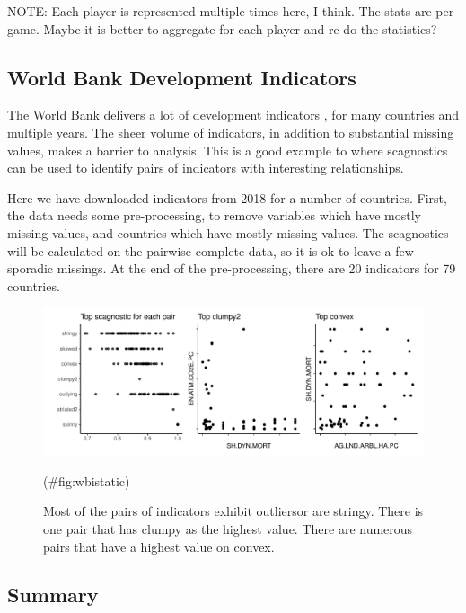 NOTE: Each player is represented multiple times here, I think. The stats
are per game. Maybe it is better to aggregate for each player and re-do
the statistics?

\hypertarget{world-bank-development-indicators}{%
\subsection{World Bank Development
Indicators}\label{world-bank-development-indicators}}

The World Bank delivers a lot of development indicators \citep{WBI}, for
many countries and multiple years. The sheer volume of indicators, in
addition to substantial missing values, makes a barrier to analysis.
This is a good example to where scagnostics can be used to identify
pairs of indicators with interesting relationships.

Here we have downloaded indicators from 2018 for a number of countries.
First, the data needs some pre-processing, to remove variables which
have mostly missing values, and countries which have mostly missing
values. The scagnostics will be calculated on the pairwise complete
data, so it is ok to leave a few sporadic missings. At the end of the
pre-processing, there are 20 indicators for 79 countries.

\begin{Schunk}
\begin{figure}
\includegraphics[width=1\linewidth]{mason-lee-laa-cook_files/figure-latex/wbistatic-1} \caption[Most of the pairs of indicators exhibit outliersor are stringy]{Most of the pairs of indicators exhibit outliersor are stringy. There is one pair that has clumpy as the highest value. There are numerous pairs that have a highest value on convex.}(\#fig:wbistatic)
\end{figure}
\end{Schunk}

\hypertarget{summary}{%
\subsection{Summary}\label{summary}}

